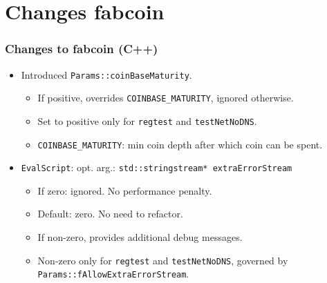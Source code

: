 \section{Changes fabcoin}
\begin{frame}[fragile]
\frametitle{Changes to fabcoin (C++)}
\begin{itemize}
\item Introduced \verb|Params::coinBaseMaturity|.
\begin{itemize}
\item If positive, overrides \verb|COINBASE_MATURITY|, ignored otherwise. 
\item Set to positive only for \verb|regtest| and \verb|testNetNoDNS|.
\item \verb|COINBASE_MATURITY|: min coin depth after which coin can be spent.
\end{itemize}
\item \verb|EvalScript|: opt. arg.: \verb|std::stringstream* extraErrorStream|
\begin{itemize}
	\item If zero: ignored. No performance penalty.
	\item Default: zero. No need to refactor.
	\item If non-zero, provides additional debug messages.
	\item Non-zero only for \verb|regtest| and \verb|testNetNoDNS|, governed by \verb|Params::fAllowExtraErrorStream|.
\end{itemize}
	
\end{itemize}

\end{frame}